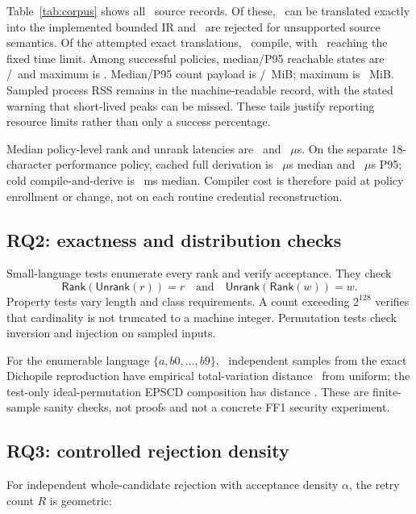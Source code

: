 \documentclass[preprint,12pt]{elsarticle}
\newcommand{\Rank}{\mathsf{Rank}}
\newcommand{\Unrank}{\mathsf{Unrank}}
\begin{document}
Table~\ref{tab:corpus} shows all \CorpusTotal\ source records. Of these,
\CorpusTranslated\ can be translated exactly into the implemented bounded IR
and \CorpusUnsupported\ are rejected for unsupported source semantics. Of the
attempted exact translations, \CorpusCompiled\ compile, with \CorpusTimeout\
reaching the fixed time limit. Among successful policies, median/P95 reachable
states are \CorpusMedianStates/\CorpusNinetyFifthStates\ and maximum is
\CorpusMaxStates. Median/P95 count payload is
\CorpusMedianPayloadMiB/\CorpusNinetyFifthPayloadMiB~MiB; maximum is
\CorpusMaxPayloadMiB~MiB. Sampled process RSS remains in the machine-readable
record, with the stated warning that short-lived peaks can be missed. These
tails justify reporting resource
limits rather than only a success percentage.

Median policy-level rank and unrank latencies are \CorpusMedianRankUs\ and
\CorpusMedianUnrankUs~$\mu$s.
On the separate 18-character performance policy, cached full derivation is
\WarmMedianUs~$\mu$s median and \WarmNinetyFifthUs~$\mu$s P95; cold compile-and-derive
is \ColdMedianMs~ms
median. Compiler cost is therefore paid at policy enrollment or change, not on
each routine credential reconstruction.

\subsection{RQ2: exactness and distribution checks}

Small-language tests enumerate every rank and verify acceptance. They check
\[
\Rank(\Unrank(r))=r
\quad\text{and}\quad
\Unrank(\Rank(w))=w.
\]
Property tests vary length and
class requirements. A count exceeding $2^{128}$ verifies that cardinality is
not truncated to a machine integer. Permutation tests check inversion and
injection on sampled inputs.

For the enumerable language $\{a,b0,\ldots,b9\}$, \DistributionSamples\ independent samples
from the exact Dichopile reproduction have empirical total-variation distance
\DichopileTvd\ from uniform; the test-only ideal-permutation EPSCD composition has
distance \EpscdTvd. These are finite-sample sanity checks, not proofs and not a
concrete FF1 security experiment.

\subsection{RQ3: controlled rejection density}

For independent whole-candidate rejection with acceptance density $\alpha$,
the retry count $R$ is geometric:
\end{document}
